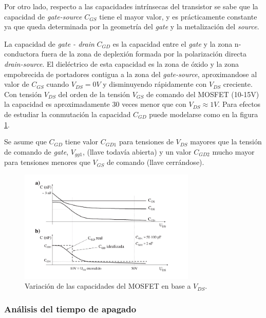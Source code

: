 \documentclass[10pt,a4paper]{article}
\begin{document}
Por otro lado, respecto a las capacidades intrínsecas del transistor se sabe que
la capacidad de \emph{gate-source} $C_{GS}$ tiene el mayor valor, y es
prácticamente constante ya que queda determinada por la geometría del
\emph{gate} y la metalización del \emph{source}.

La capacidad de \emph{gate - drain}  $C_{GD}$ es la capacidad entre el
\emph{gate} y la zona n- conductora fuera de la zona de deplexión formada por la
polarización directa \emph{drain-source}. El dieléctrico de esta capacidad es la
zona de óxido y la zona empobrecida de portadores contigua a la zona del
\emph{gate-source}, aproximandose al valor de $C_{GS}$ cuando $V_{DS}= 0V$ y
disminuyendo rápidamente con $V_{DS}$ creciente. Con tensión $V_{DS}$ del orden
de la tensión $V_{GS}$ de comando del MOSFET (10-15V) la capacidad es
aproximadamente 30 veces menor  que con $V_{DS}\approx1V$. Para efectos de
estudiar la conmutación la capacidad $C_{GD}$ puede modelarse como en la figura
\ref{aprox_CGD}.

Se asume que $C_{GD}$ tiene valor $C_{GD1}$ para tensiones de $V_{DS}$ mayores
que la tensión de comando de \emph{gate}, $V_{gg1}$, (llave todavía abierta) y
un valor $C_{GD2}$ mucho mayor para tensiones menores que $V_{GS}$ de comando
(llave cerrándose)\cite{Mohan1989}.

\begin{figure}[h!]
	\begin{center}
		\includegraphics[width=0.75\textwidth]{Capacitor_vs_Vds.pdf}
		\caption{Variación de las capacidades del MOSFET en base a $V_{DS}$.}
		\label{aprox_CGD}
	\end{center}
\end{figure}
\FloatBarrier

\subsubsection{Análisis del tiempo de apagado}
\end{document}
